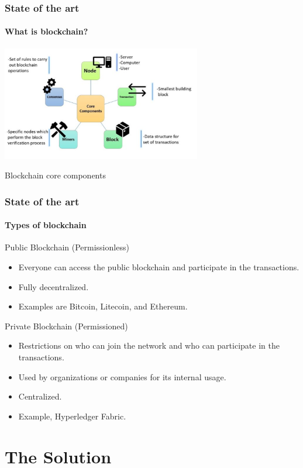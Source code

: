 \documentclass[english,hangout]{beamer}
\begin{document}
\begin{frame}[fragile]
 \frametitle{State of the art}
 \framesubtitle{What is blockchain?}
    \begin{center}
        \vspace{-1.2em}
            \includegraphics[width=11cm\textwidth,height=5cm]{components.png}
            
             \caption{Blockchain core components \cite{b9}}
        \end{center}
        \vspace{-3mm}
\end{frame}

\begin{frame}[fragile]
 \frametitle{State of the art}
 \framesubtitle{Types of blockchain}
 Public Blockchain (Permissionless)
 \begin{itemize}
     \item Everyone can access the public blockchain and participate in
the transactions.
     \item Fully decentralized.
     \item Examples are Bitcoin, Litecoin, and Ethereum.
 \end{itemize}
 Private Blockchain (Permissioned)
 \begin{itemize}
     \item Restrictions on who can join the
network and who can participate in the transactions.
    \item Used by organizations or companies for its internal usage.
    \item Centralized.
    \item Example, Hyperledger Fabric.
 \end{itemize}
\end{frame}

\section{The Solution}
\end{document}
